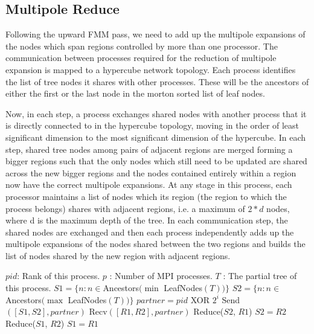 \documentclass[11pt]{article}
\begin{document}
\subsection{Multipole Reduce}
Following the upward FMM pass, we need to add up the multipole expansions of 
the nodes which span regions controlled by more than one processor. The 
communication between processes required for the reduction of multipole 
expansion is mapped to a hypercube network topology. Each process identifies 
the list of tree nodes it shares with other processes. These will be the 
ancestors of either the first or the last node in the morton sorted list of 
leaf nodes.

Now, in each step, a process exchanges shared nodes with another process that 
it is directly connected to in the hypercube topology, moving in the order of 
least significant dimension to the most significant dimension of the hypercube.
In each step, shared tree nodes among pairs of adjacent regions are merged 
forming a bigger regions such that the only nodes which still need to be 
updated are shared across the new bigger regions and the nodes contained 
entirely within a region now have the correct multipole expansions. At any 
stage in this process, each processor maintains a list of nodes which its 
region (the region to which the process belongs) shares with adjacent regions, 
i.e. a maximum of $2 * d$ nodes, where d is the maximum depth of the tree. In 
each communication step, the shared nodes are exchanged and then each process 
independently adds up the multipole expansions of the nodes shared between the 
two regions and builds the list of nodes shared by the new region with adjacent 
regions.

\begin{algorithm}[H]
\caption{$MULTIPOLE\_REDUCE$}
\label{multipole_reduce}
\begin{algorithmic}
  \STATE $pid$: Rank of this process.
  \STATE $p$ : Number of MPI processes.
  \STATE $T$  : The partial tree of this process.
  \STATE {}
  \STATE {}
  \STATE $S1 = \{n: n \in $Ancestors$(\min $ LeafNodes$(T))\}$
  \STATE $S2 = \{n: n \in $Ancestors$(\max $ LeafNodes$(T))\}$
    \STATE $partner = pid$ XOR $2^i$
    \STATE Send$([S1, S2], partner)$
    \STATE Recv$([R1, R2], partner)$
      \STATE Reduce($S2$, $R1$)
      \STATE $S2 = R2$
    \ELSE
      \STATE Reduce($S1$, $R2$)
      \STATE $S1 = R1$
    \ENDIF
  \ENDFOR
\end{algorithmic}
\end{algorithm}
\end{document}
